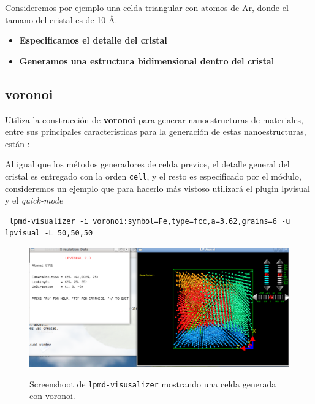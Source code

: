 Consideremos por ejemplo una celda triangular con atomos de Ar, donde el tamano del cristal es de 10 \AA.

\begin{itemize}
 \item \textbf{Especificamos el detalle del cristal}
 \item \textbf{Generamos una estructura bidimensional dentro del cristal}
\end{itemize}

\subsection{voronoi}
Utiliza la construcci\'on de \textbf{voronoi} para generar nanoestructuras de materiales, entre sus principales caracter\'isticas para la generaci\'on de estas nanoestructuras, est\'an :


Al igual que los m\'etodos generadores de celda previos, el detalle general del cristal es entregado con la orden \verb|cell|, y el resto es especificado por el m\'odulo, consideremos un ejemplo que para hacerlo m\'as vistoso utilizar\'a el plugin lpvisual y el \textit{quick-mode}

\begin{verbatim}
 lpmd-visualizer -i voronoi:symbol=Fe,type=fcc,a=3.62,grains=6 -u lpvisual -L 50,50,50
\end{verbatim}

\begin{figure}[h!]
 \centering
 \includegraphics[scale=.35]{voronoi-1.png}
 \label{fig:voronoi-1}
 \caption{Screenshoot de \texttt{lpmd-visusalizer} mostrando una celda generada con voronoi.}
\end{figure}

